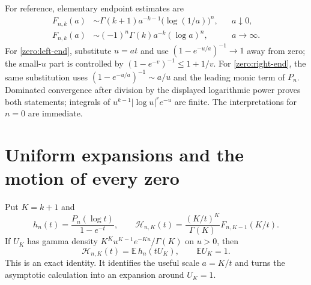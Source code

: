 \documentclass[11pt,a4paper]{article}
\theoremstyle{definition}
\theoremstyle{remark}
\numberwithin{equation}{section}
\begin{document}
For reference, elementary endpoint estimates are
\begin{align}
 F_{n,k}(a)&\sim \Gamma(k+1)a^{-k-1}\bigl(\log(1/a)\bigr)^n,
                  &&a\downarrow0,\label{zero:left-end}\\
 F_{n,k}(a)&\sim (-1)^n\Gamma(k)a^{-k}(\log a)^n,
                  &&a\to\infty.\label{zero:right-end}
\end{align}
For \eqref{zero:left-end}, substitute $u=at$ and use
$(1-e^{-u/a})^{-1}\to1$ away from zero; the small-$u$ part is
controlled by $(1-e^{-v})^{-1}\leq1+1/v$.
For \eqref{zero:right-end}, the same substitution uses
$(1-e^{-u/a})^{-1}\sim a/u$ and the leading monic term of $P_n$.
Dominated convergence after division by the displayed logarithmic
power proves both statements; integrals of $u^{k-1}|\log u|^r e^{-u}$
are finite.  The interpretations for $n=0$ are immediate.

\section{Uniform expansions and the motion of every zero}
\label{zero:asymptotic-section}

Put $K=k+1$ and
\[
 h_n(t)=\frac{P_n(\log t)}{1-e^{-t}},\qquad
 \mathcal H_{n,K}(t)=\frac{(K/t)^K}{\Gamma(K)}F_{n,K-1}(K/t).
\]
If $U_K$ has gamma density
$K^K u^{K-1}e^{-Ku}/\Gamma(K)$ on $u>0$, then
\begin{equation}\label{zero:expectation}
 \mathcal H_{n,K}(t)=\mathbb E\,h_n(tU_K),
 \qquad \mathbb E U_K=1.
\end{equation}
This is an exact identity.  It identifies the useful scale $a=K/t$
and turns the asymptotic calculation into an expansion around $U_K=1$.
\end{document}

